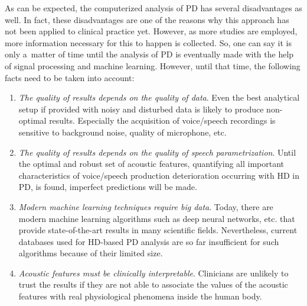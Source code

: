 As can be expected, the computerized analysis of PD has several disadvantages as well. In fact, these disadvantages are one of the reasons why this approach has not been applied to clinical practice yet. However, as more studies are employed, more information necessary for this to happen is collected. So, one can say it is only a~matter of time until the analysis of PD is eventually made with the help of signal processing and machine learning. However, until that time, the following facts need to be taken into account:
\begin{enumerate}
	\item \textit{The quality of results depends on the quality of data}. Even the best analytical setup if provided with noisy and disturbed data is likely to produce non-optimal results. Especially the acquisition of voice/speech recordings is sensitive to background noise, quality of microphone, etc.
	\item \textit{The quality of results depends on the quality of speech parametrization}. Until the optimal and robust set of acoustic features, quantifying all important characteristics of voice/speech production deterioration occurring with HD in PD, is found, imperfect predictions will be made.
	\item \textit{Modern machine learning techniques require big data}. Today, there are modern machine learning algorithms such as deep neural networks, etc. that provide state-of-the-art results in many scientific fields. Nevertheless, current databases used for HD-based PD analysis are so far insufficient for such algorithms because of their limited size.
	\item \textit{Acoustic features must be clinically interpretable}. Clinicians are unlikely to trust the results if they are not able to associate the values of the acoustic features with real physiological phenomena inside the human body.
\end{enumerate}